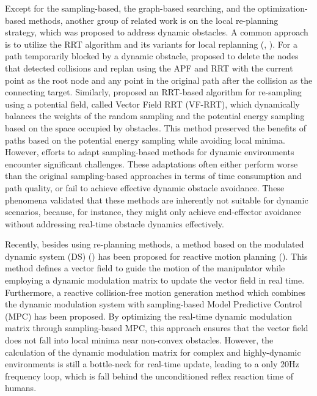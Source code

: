 Except for the sampling-based, the graph-based searching, and the optimization-based methods, another group of related work is on the local re-planning strategy, which was proposed to address dynamic obstacles. A common approach is to utilize the RRT algorithm and its variants for local replanning (\cite{2006_ICRA_Replanning_with_rrts}, \cite{2021_RSJ_Robotic_lime_picking_by_considering}). For a path temporarily blocked by a dynamic obstacle, \cite{2023_RAL_Path_Re_Planning_Design} proposed to delete the nodes that detected collisions and replan using the APF and RRT with the current point as the root node and any point in the original path after the collision as the connecting target. Similarly, \cite{2013_ASCC_VF_RRT} proposed an RRT-based algorithm for re-sampling using a potential field, called Vector Field RRT (VF-RRT), which dynamically balances the weights of the random sampling and the potential energy sampling based on the space occupied by obstacles. This method preserved the benefits of paths based on the potential energy sampling while avoiding local minima. However, efforts to adapt sampling-based methods for dynamic environments encounter significant challenges. These adaptations often either perform worse than the original sampling-based approaches in terms of time consumption and path quality, or fail to achieve effective dynamic obstacle avoidance. These phenomena validated that these methods are inherently not suitable for dynamic scenarios, because, for instance, they might only achieve end-effector avoidance without addressing real-time obstacle dynamics effectively.

Recently, besides using re-planning methods, a method based on the modulated dynamic system (DS) (\cite{2012_AR_DS}) has been proposed for reactive motion planning (\cite{2024_IJRR_ReactiveMPC}). This method defines a vector field to guide the motion of the manipulator while employing a dynamic modulation matrix to update the vector field in real time. Furthermore, a reactive collision-free motion generation method which combines the dynamic modulation system with sampling-based Model Predictive Control (MPC) has been proposed. By optimizing the real-time dynamic modulation matrix through sampling-based MPC, this approach ensures that the vector field does not fall into local minima near non-convex obstacles. However, the calculation of the dynamic modulation matrix for complex and highly-dynamic environments is still a bottle-neck for real-time update, leading to a only 20Hz frequency loop, which is fall behind the unconditioned reflex reaction time of humans.

